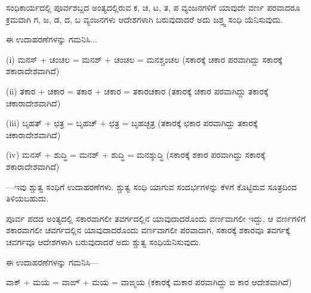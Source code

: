 \begin{kbvrule}
\hspace{0.5em}ಸಂಧಿಕಾರ್ಯದಲ್ಲಿ ಪೂರ್ವಶಬ್ದದ ಅಂತ್ಯದಲ್ಲಿರುವ ಕ, ಚ, ಟ, ತ, ಪ ವ್ಯಂಜನಗಳಿಗೆ ಯಾವುದೇ ವರ್ಣ ಪರವಾದರೂ ಕ್ರಮವಾಗಿ ಗ, ಜ, ಡ, ದ, ಬ ವ್ಯಂಜನಗಳು ಆದೇಶಗಳಾಗಿ ಬರುವುದಾದರೆ ಅದು ಜಶ್ತ್ವ ಸಂಧಿ ಯೆನಿಸುವುದು.
\end{kbvrule}


\noindent\hspace*{2.2em}ಈ ಉದಾಹರಣೆಗಳನ್ನು ಗಮನಿಸಿ...\par

\indent ({\kbvlatin i}) ಮನಸ್‌ + ಚಂಚಲ = ಮನಶ್‌ + ಚಂಚಲ = ಮನಶ್ಚಂಚಲ (ಸಕಾರಕ್ಕೆ ಚಕಾರ ಪರವಾಗಿದ್ದು ಸಕಾರಕ್ಕೆ ಶಕಾರಾದೇಶವಾಗಿದೆ)\par

\indent ({\kbvlatin ii}) ತಕಾರ + ಚಕಾರ = ತಕಾರ + ಚಕಾರ = ತಕಾರಚಕಾರ (ತಕಾರಕ್ಕೆ ಚಕಾರ ಪರವಾಗಿದ್ದು ತಕಾರಕ್ಕೆ ಚಕಾರಾದೇಶವಾಗಿದೆ)\par

\indent ({\kbvlatin iii}) ಬೃಹತ್‌ + ಛತ್ರ = ಬೃಹಚ್‌ + ಛತ್ರ = ಬೃಹಚ್ಛತ್ರ (ತಕಾರಕ್ಕೆ ಛಕಾರ ಪರವಾಗಿದ್ದು ತಕಾರಕ್ಕೆ ಚಕಾರಾದೇಶವಾಗಿದೆ)\par

\indent ({\kbvlatin iv}) ಮನಸ್‌ + ಶುದ್ಧಿ = ಮನಶ್‌ + ಶುದ್ಧಿ = ಮನಶ್ಶುದ್ಧಿ (ಸಕಾರಕ್ಕೆ ಶಕಾರ ಪರವಾಗಿದ್ದು ಸಕಾರಕ್ಕೆ ಶಕಾರಾದೇಶವಾಗಿದೆ)\par

\indent —ಇವು ಶ್ಚುತ್ವ ಸಂಧಿಗೆ ಉದಾಹರಣೆಗಳು. ಶ್ಚುತ್ವ ಸಂಧಿ ಯಾಗುವ ಸಂದರ್ಭಗಳನ್ನು ಕೆಳಗೆ ಕೊಟ್ಟಿರುವ ಸೂತ್ರದಿಂದ ತಿಳಿಯಬಹುದು.\par

\begin{kbvrule}
\hspace{0.5em}ಪೂರ್ವ ಪದದ ಅಂತ್ಯದಲ್ಲಿ ಸಕಾರವಾಗಲೀ ತವರ್ಗದಲ್ಲಿನ ಯಾವುದಾದರೊಂದು ವರ್ಣವಾಗಲೀ ಇದ್ದು, ಆ ವರ್ಣಗಳಿಗೆ ಶಕಾರವಾಗಲೀ ಚವರ್ಗದಲ್ಲಿನ ಯಾವುದಾದರೊಂದು ವರ್ಣವಾಗಲೀ ಪರವಾದಾಗ, ಸಕಾರಕ್ಕೆ ಶಕಾರವೂ ತವರ್ಗಕ್ಕೆ ಚವರ್ಗವೂ ಆದೇಶಗಳಾಗಿ ಬರುವುದಾದರೆ ಅದು ಶ್ಚುತ್ವ ಸಂಧಿಯೆನಿಸುವುದು.
\end{kbvrule}


\indent ಈ ಉದಾಹರಣೆಗಳನ್ನು ಗಮನಿಸಿ—\par

\indent ವಾಕ್‌ + ಮಯ = ವಾಙ್‌ + ಮಯ = ವಾಙ್ಮಯ (ಕಕಾರಕ್ಕೆ ಮಕಾರ ಪರವಾಗಿದ್ದು ಙ ಕಾರ ಆದೇಶವಾಗಿದೆ)\par
